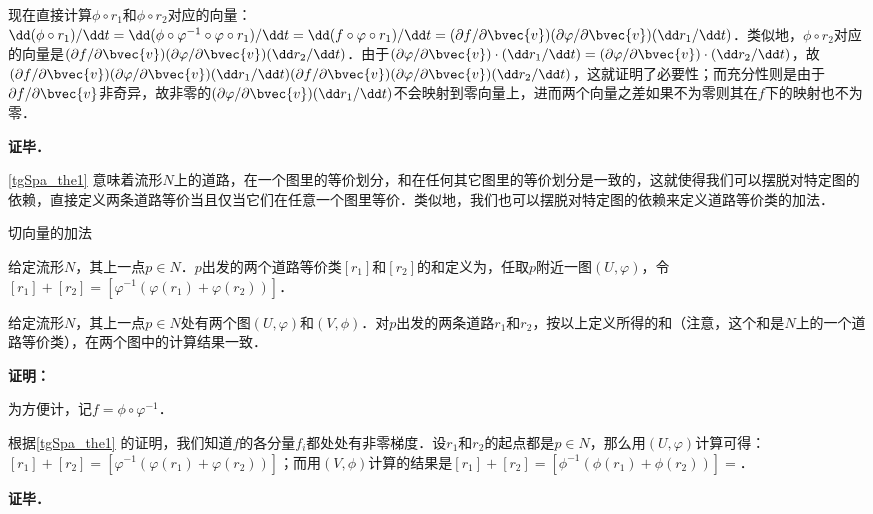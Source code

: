 现在直接计算$\phi\circ r_1$和$\phi\circ r_2$对应的向量：$\dd(\phi\circ r_1)/\dd t=\dd(\phi\circ\varphi^{-1}\circ\varphi\circ r_1)/\dd t=\dd(f\circ\varphi\circ r_1)/\dd t=(\partial f/\partial\bvec{v})(\partial\varphi/\partial\bvec{v})(\dd r_1/\dd t)$．类似地，$\phi\circ r_2$对应的向量是$(\partial f/\partial\bvec{v})(\partial\varphi/\partial\bvec{v})(\dd r_2/\dd t)$．由于$(\partial\varphi/\partial\bvec{v})\cdot(\dd r_1/\dd t)=(\partial\varphi/\partial\bvec{v})\cdot(\dd r_2/\dd t)$，故$(\partial f/\partial\bvec{v})(\partial\varphi/\partial\bvec{v})(\dd r_1/\dd t)(\partial f/\partial\bvec{v})(\partial\varphi/\partial\bvec{v})(\dd r_2/\dd t)$，这就证明了必要性；而充分性则是由于$\partial f/\partial\bvec{v}$非奇异，故非零的$(\partial\varphi/\partial\bvec{v})(\dd r_1/\dd t)$不会映射到零向量上，进而两个向量之差如果不为零则其在$f$下的映射也不为零．


\textbf{证毕．}

\autoref{tgSpa_the1} 意味着流形$N$上的道路，在一个图里的等价划分，和在任何其它图里的等价划分是一致的，这就使得我们可以摆脱对特定图的依赖，直接定义两条道路等价当且仅当它们在任意一个图里等价．类似地，我们也可以摆脱对特定图的依赖来定义道路等价类的加法．

\begin{definition}{切向量的加法}

给定流形$N$，其上一点$p\in N$．$p$出发的两个道路等价类$[r_1]$和$[r_2]$的和定义为，任取$p$附近一图$(U, \varphi)$，令$[r_1]+[r_2]=[\varphi^{-1}(\varphi(r_1)+\varphi(r_2))]$．

\end{definition}

\begin{theorem}{}
给定流形$N$，其上一点$p\in N$处有两个图$(U, \varphi)$和$(V, \phi)$．对$p$出发的两条道路$r_1$和$r_2$，按以上定义所得的和（注意，这个和是$N$上的一个道路等价类），在两个图中的计算结果一致．
\end{theorem}

\textbf{证明：}

为方便计，记$f=\phi\circ\varphi^{-1}$．

根据\autoref{tgSpa_the1} 的证明，我们知道$f$的各分量$f_i$都处处有非零梯度．设$r_1$和$r_2$的起点都是$p\in N$，那么用$(U, \varphi)$计算可得：$[r_1]+[r_2]=[\varphi^{-1}(\varphi(r_1)+\varphi(r_2))]$；而用$(V, \phi)$计算的结果是$[r_1]+[r_2]=[\phi^{-1}(\phi(r_1)+\phi(r_2))]=$．

\textbf{证毕．}






